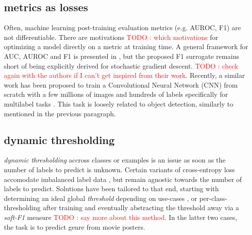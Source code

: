 \documentclass[sigconf,natbib,screen=true,review=true,anonymous]{acmart}
\newcommand\todo[1]{\textcolor{red}{TODO : #1}}
\begin{document}
\subsection{metrics as losses}
\label{sec:org13c4a5e}

Often, machine learning post-training evaluation metrics (e.g. AUROC, F1) are not differentiable. There are motivations \todo{which motivations} for optimizing a model directly on a metric at training time. A general framework for AUC, AUROC and F1 is presented in \cite{optimizableLosses}, but the proposed F1 surrogate remains short of being explicitly derived for stochastic gradient descent. \todo{check again with the authors if I can't get inspired from their work}. Recently, a similar work has been proposed to train a Convolutional Neural Network (CNN) from scratch with a few millions of images and hundreds of labels specifically for multilabel tasks \cite{tencent}. This task is loosely related to object detection, similarly to \cite{multitaskLabelImages} mentioned in the previous paragraph.



\subsection{dynamic thresholding}
\label{sec:orgbae1eea}

\emph{dynamic thresholding} accross classes or examples is an issue as soon as the number of labels to predict is unknown. Certain variants of cross-entropy loss accomodate imbalanced label data  \cite{focalLoss}, but remain agnostic towards the number of labels to predict. Solutions have been tailored to that end, starting with determining an ideal global \emph{threshold} depending on use-cases \cite{threshForF1}, or per-class-thresholding after training \cite{moviePosters} and eventually abstracting the threshold away via a \emph{soft-F1} measure \cite{softF1} \todo{say more about this method}. In the latter two cases, the task is to predict genre from movie posters.
\end{document}
